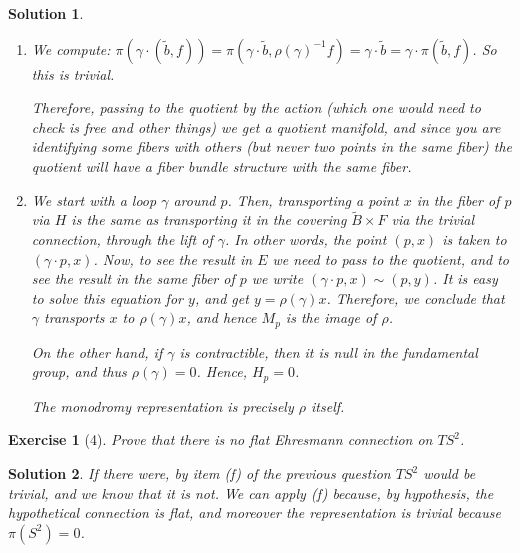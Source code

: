 \documentclass{article}
\theoremstyle{plain}
\newtheorem*{ex}{Exercise}
\theoremstyle{nonumberplain}
\newtheorem{sol}{Solution}
\begin{document}
\begin{sol}
\begin{enumerate}
\item We compute: $\pi(\gamma \cdot (\tilde b, f)) = \pi(\gamma \cdot \tilde b, \rho(\gamma)^{-1} f) = \gamma \cdot \tilde b = \gamma \cdot \pi(\tilde b, f)$. So this is trivial.

Therefore, passing to the quotient by the action (which one would need to check is free and other things) we get a quotient manifold, and since you are identifying some fibers with others (but never two points in the same fiber) the quotient will have a fiber bundle structure with the same fiber.

\item We start with a loop $\gamma$ around $p$. Then, transporting a point $x$ in the fiber of $p$ via $H$ is the same as transporting it in the covering $\tilde B \times F$ via the trivial connection, through the lift of $\gamma$. In other words, the point $(p,x)$ is taken to $(\gamma \cdot p, x)$. Now, to see the result in $E$ we need to pass to the quotient, and to see the result in the same fiber of $p$ we write $(\gamma \cdot p, x) \sim (p, y)$. It is easy to solve this equation for $y$, and get $y = \rho(\gamma) x$. Therefore, we conclude that $\gamma$ transports $x$ to $\rho(\gamma)x$, and hence $M_p$ is the image of $\rho$.

On the other hand, if $\gamma$ is contractible, then it is null in the fundamental group, and thus $\rho(\gamma) = 0$. Hence, $H_p = 0$.

The monodromy representation is precisely $\rho$ itself.
\end{enumerate}
\end{sol}

\begin{ex}[4]
Prove that there is no flat Ehresmann connection on $TS^2$.
\end{ex}

\begin{sol}
If there were, by item (f) of the previous question $TS^2$ would be trivial, and we know that it is not. We can apply (f) because, by hypothesis, the hypothetical connection is flat, and moreover the representation is trivial because $\pi(S^2) = 0$.
\end{sol}
\end{document}
